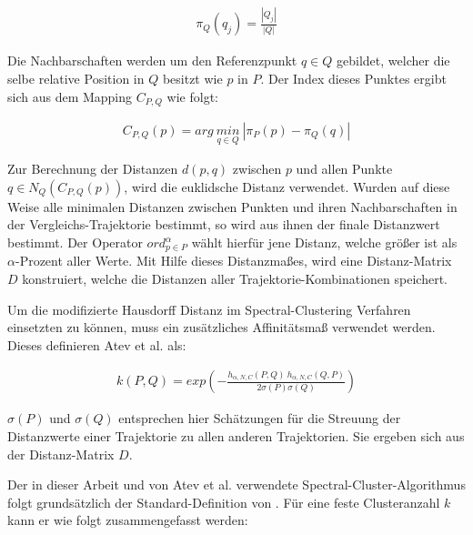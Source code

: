 \begin{ceqn}
\begin{align}
\label{eq_atev_relPos}
    \pi_Q(q_j) = \frac{|Q_j|}{|Q|}
\end{align}
\end{ceqn}

Die Nachbarschaften werden um den Referenzpunkt $q \in Q$ gebildet, welcher die selbe relative Position
in $Q$ besitzt wie $p$ in $P$. Der Index dieses Punktes ergibt sich aus dem Mapping $C_{P,Q}$ wie folgt:

\begin{ceqn}
\begin{align}
\label{eq_atev_findPointAtRelPow}
    C_{P,Q}(p) = arg\ \underset{q \in Q}{min}\ |\pi_P(p) - \pi_Q(q)|
\end{align}
\end{ceqn}

Zur Berechnung der Distanzen $d(p,q)$ zwischen $p$ und allen Punkte $q \in N_Q(C_{P,Q}(p))$, wird die euklidsche
Distanz verwendet. Wurden auf diese Weise alle minimalen Distanzen zwischen Punkten und ihren Nachbarschaften in
der Vergleichs-Trajektorie bestimmt, so wird aus ihnen der finale Distanzwert bestimmt. Der Operator
$ord_{p \in P}^{\alpha}$ wählt hierfür jene Distanz, welche größer ist als $\alpha$-Prozent aller Werte.
Mit Hilfe dieses Distanzmaßes, wird eine Distanz-Matrix $D$ konstruiert, welche die Distanzen
aller Trajektorie-Kombinationen speichert.

Um die modifizierte Hausdorff Distanz im Spectral-Clustering Verfahren einsetzten zu können, muss ein
zusätzliches Affinitätsmaß verwendet werden.
Dieses definieren Atev et al. als:

\begin{ceqn}
\begin{align}
    k(P,Q) = exp (- \frac{h_{\alpha, N, C}(P,Q)\ h_{\alpha, N, C}(Q,P)}{2 \sigma(P) \sigma(Q)})
\end{align}
\end{ceqn}

$\sigma(P)$ und $\sigma(Q)$ entsprechen hier Schätzungen für die Streuung der Distanzwerte einer Trajektorie
zu allen anderen Trajektorien. Sie ergeben sich aus der Distanz-Matrix $D$.

Der in dieser Arbeit und von Atev et al. verwendete Spectral-Cluster-Algorithmus folgt grundsätzlich
der Standard-Definition von \cite[]{Ng2002}.
Für eine feste Clusteranzahl $k$ kann er wie folgt zusammengefasst werden:

